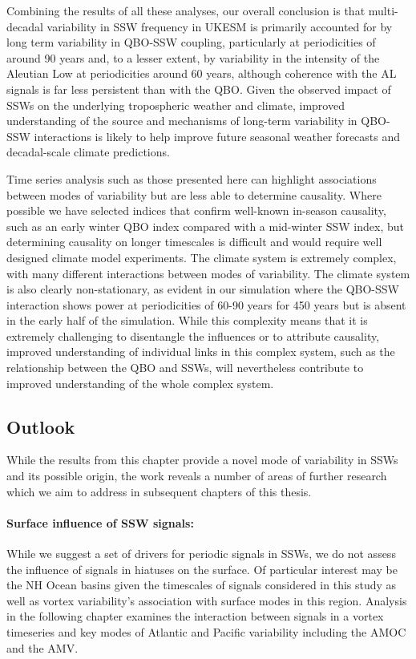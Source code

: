 Combining the results of all these analyses, our overall conclusion is that multi-decadal variability in SSW frequency in UKESM is primarily accounted for by long term variability in QBO-SSW coupling, particularly at periodicities of around 90 years and, to a lesser extent, by variability in the intensity of the Aleutian Low at periodicities around 60 years, although coherence with the AL signals is far less persistent than with the QBO. Given the observed impact of SSWs on the underlying tropospheric weather and climate, improved understanding of the source and mechanisms of long-term variability in QBO-SSW interactions is likely to help improve future seasonal weather forecasts and decadal-scale climate predictions.

Time series analysis such as those presented here can highlight associations between modes of variability but are less able to determine causality. Where possible we have selected indices that confirm well-known in-season causality, such as an early winter QBO index compared with a mid-winter SSW index, but determining causality on longer timescales is  difficult and would require well designed climate model experiments. The climate system is extremely complex, with many different interactions between modes of variability. The climate system is also clearly non-stationary, as evident in our simulation where the QBO-SSW interaction shows power at periodicities of 60-90 years for 450 years but is absent in the early half of the simulation. While this complexity means that it is extremely challenging to disentangle the influences or to attribute causality, improved understanding of individual links in this complex system, such as the relationship between the QBO and SSWs, will nevertheless contribute to improved understanding of the whole complex system.  


\subsection{Outlook}
While the results from this chapter provide a novel mode of variability in SSWs and its possible origin, the work reveals a number of areas of further research which we aim to address in subsequent chapters of this thesis.

\paragraph{Surface influence of SSW signals:} While we suggest a set of drivers for periodic signals in SSWs, we do not assess the influence of signals in hiatuses on the surface. Of particular interest may be the NH Ocean basins given the timescales of signals considered in this study as well as vortex variability's association with surface modes in this region. Analysis in the following chapter examines the interaction between signals in a vortex timeseries and key modes of Atlantic and Pacific variability including the AMOC and the AMV.

